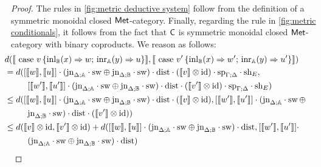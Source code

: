 \begin{proof}
   The rules in \autoref{fig:metric deductive system} follow from the definition of a symmetric monoidal closed $\mathsf{Met}$-category. Finally, regarding  the rule in  \autoref{fig:metric conditionals}, it follows from the fact that $\mathsf{C}$ is symmetric monoidal closed $\mathsf{Met}$-category with binary coproducts. We reason as follows:
  \begin{align*}
    & \hspace{-20pt} d( \llbracket  \text{ case } v \, \{\text{inl}_{\typeB}  (x) \Rightarrow w ; \, \text{inr}_{\typeA} (y) \Rightarrow u\}  \rrbracket, \llbracket \text{ case } v' \, \{\text{inl}_{\typeB}  (x) \Rightarrow w' ; \, \text{inr}_{\typeA} (y) \Rightarrow u'\} \rrbracket)  \\
    &  \hspace{-20pt} = d( [\llbracket w\rrbracket ,\llbracket u\rrbracket] \comp (\text{jn}_{\Delta;\typeA}\comp \sw \oplus \text{jn}_{\Delta;\typeB}\comp \sw) \comp \dist \comp (\llbracket v\rrbracket \otimes \text{id}) \comp \text{sp}_{\Gamma;\Delta} \comp \text{sh}_{E}, \\
    & \hspace{7pt} [\llbracket w'\rrbracket ,\llbracket u'\rrbracket] \comp (\text{jn}_{\Delta;\typeA}\comp \sw \oplus \text{jn}_{\Delta;\typeB}\comp \sw) \comp \dist \comp (\llbracket v'\rrbracket \otimes \text{id}) \comp \text{sp}_{\Gamma;\Delta} \comp \text{sh}_{E})\\
    & \hspace{-20pt} \leq  d( [\llbracket w\rrbracket ,\llbracket u\rrbracket] \comp (\text{jn}_{\Delta;\typeA}\comp \sw \oplus \text{jn}_{\Delta;\typeB}\comp \sw) \comp \dist \comp (\llbracket v\rrbracket \otimes \text{id}),  [\llbracket w'\rrbracket ,\llbracket u'\rrbracket] \comp (\text{jn}_{\Delta;\typeA}\comp \sw \, \oplus \\
    & \hspace{7pt}  \text{jn}_{\Delta;\typeB}\comp \sw) \comp \dist \comp (\llbracket v'\rrbracket \otimes \text{id}) )\\
    & \hspace{-20pt} \leq  d(\llbracket v\rrbracket \otimes \text{id}, \llbracket v'\rrbracket \otimes \text{id}) +  d( [\llbracket w\rrbracket ,\llbracket u\rrbracket] \comp (\text{jn}_{\Delta;\typeA}\comp \sw \oplus \text{jn}_{\Delta;\typeB}\comp \sw) \comp \dist,  [\llbracket w'\rrbracket ,\llbracket u'\rrbracket]\comp \\
    & \hspace{7pt} (\text{jn}_{\Delta;\typeA}\comp \sw \oplus \text{jn}_{\Delta;\typeB}\comp \sw) \comp \dist) \\

\end{align*}
\end{proof}
